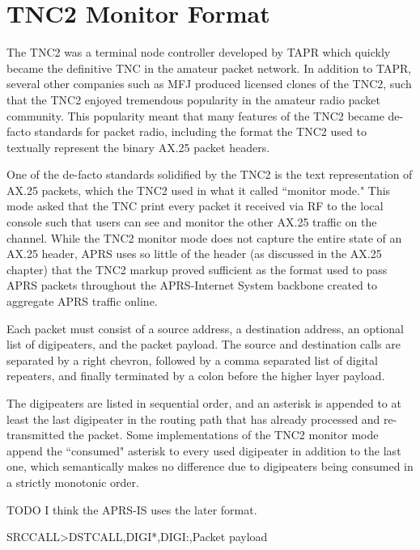\chapter{TNC2 Monitor Format}

The TNC2 was a terminal node controller developed by TAPR which
quickly became the definitive TNC in the amateur packet network.
In addition to TAPR, several other companies such as MFJ produced
licensed clones of the TNC2, such that the TNC2 enjoyed
tremendous popularity in the amateur radio packet community.
This popularity meant that many features of the TNC2 
became de-facto 
standards for packet radio, including the format the TNC2
used to textually represent the binary AX.25 packet headers.

One of the de-facto standards solidified by the TNC2 is the text
representation of AX.25 packets, which the TNC2 used in what it
called ``monitor mode." This mode asked that the TNC print 
every packet it received via RF to the local console such that
users can see and monitor the other AX.25 traffic on the channel.
While the TNC2 monitor mode does not capture the entire state of 
an AX.25 header, APRS uses so little of the header (as discussed in
the AX.25 chapter) that the TNC2 markup proved sufficient as the 
format used to pass APRS packets throughout the APRS-Internet System
backbone created to aggregate APRS traffic online.

Each packet must consist of a source address, a destination address,
an optional list of digipeaters, and the packet payload.
The source and destination calls are separated by a right chevron,
followed by a comma separated list of digital repeaters, and finally
terminated by a colon before the higher layer payload.

The digipeaters are listed in sequential order, and an asterisk
is appended to at least the last digipeater in the 
routing path that has already processed and re-transmitted the packet.
Some implementations of the TNC2 monitor mode append the ``consumed"
asterisk to every used digipeater in addition to the last one,
which semantically makes no difference due to digipeaters
being consumed in a strictly monotonic order.

TODO I think the APRS-IS uses the later format.

SRCCALL\textgreater{}DSTCALL,DIGI*,DIGI:,Packet payload
